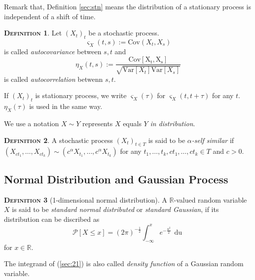 \documentclass[a4paper, twoside, 11pt]{article}
\theoremstyle{definition}
\newtheorem{definition}{\scshape Definition}[section]
\newcommand{\sqbr}[1]{\left[ {#1} \right]}
\begin{document}
Remark that, Definition \ref{sec:stn} means the distribution of a stationary process is independent of a shift of time.

\begin{definition}
  Let $(X_t)_t$ be a stochastic process. 
  \begin{equation*}
	\varsigma_X(t,s) := \mathrm{Cov}(X_t, X_s) 
  \end{equation*} is called \emph{autocovariance} between $s, t$ and 
  \begin{equation*}
	\eta_X(t, s) := \frac{\mathrm{Cov[X_t, X_s]}}{\sqrt{\mathrm{Var}[X_t]\mathrm{Var}[X_s]}}
  \end{equation*}
  is called \emph{autocorrelation} betwenn $s, t$.
\end{definition}
If $(X_t)_t$ is stationary process, we write $\varsigma_X(\tau)$ for $\varsigma_X(t, t+\tau)$ for any $t$. $\eta_X(\tau)$ is used in the same way. 


We use a notation $X \sim Y$ represents $X$ equals $Y$ \emph{in distribution}. 
\begin{definition}
  A stochastic process $(X_t)_{t\in T}$ is said to be \emph{$\alpha$-self similar} if $(X_{ct_1},\dots,X_{ct_k}) \sim (c^\alpha X_{t_1},\dots, c^\alpha X_{t_k})$ for any $t_1,\dots, t_k, ct_1, \dots, ct_k \in T$ and $c>0$.
\end{definition}

\subsection{Normal Distribution and Gaussian Process}
\begin{definition}[1-dimensional normal distribution]
  A $\mathbb{R}$-valued random variable $X$ is said to be \emph{standard normal distributed} or \emph{standard Gaussian}, if its distribution can be discribed as
  \begin{equation}
	\mathcal{P}\sqbr{X \le x} = (2\pi)^{-\frac{1}{2}}\int_{-\infty}^{x} e^{-\frac{u^2}{2}}\,\mathop{du}  
	\label{sec:21}
  \end{equation}
  for $x \in \mathbb{R}$.
\end{definition}
The integrand of (\ref{sec:21}) is also called \emph{density function} of a Gaussian random variable.
\end{document}
